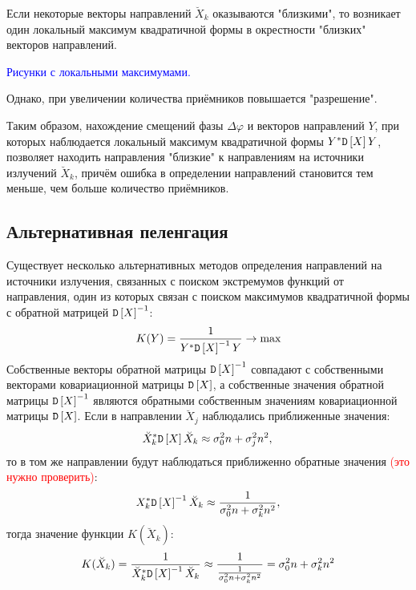 Если некоторые векторы направлений $\breve{X}_k$ оказываются "близкими"{}, то возникает один локальный максимум квадратичной формы в окрестности "близких"{} векторов направлений.

\begin{Matlab}
\end{Matlab}
\textcolor{blue}{Рисунки с локальными максимумами.}

Однако,  при увеличении количества приёмников повышается "разрешение"{}.

Таким образом, нахождение смещений фазы $\Delta \varphi$ и векторов направлений $Y$, при которых наблюдается локальный максимум квадратичной формы
$Y^* \mathtt{D} \left [ X \right ] Y$, позволяет находить направления "близкие"{} к направлениям на источники излучений $\breve{X}_k$, причём ошибка в определении направлений
становится тем меньше, чем больше количество приёмников.

\subsection{Альтернативная пеленгация}

Существует несколько альтернативных методов определения направлений на источники излучения, связанных с поиском экстремумов функций от направления, один из которых
связан с поиском максимумов квадратичной формы с обратной матрицей $\mathtt{D} \left [ X \right ]^{-1}$:
\[
    K(Y) = \frac{1}{Y^* \mathtt{D} \left [ X \right ]^{-1} Y} \rightarrow \max
\]
Собственные векторы обратной матрицы $\mathtt{D} \left [ X \right ]^{-1}$ совпадают с собственными векторами ковариационной матрицы $\mathtt{D} \left [ X \right ]$, а собственные значения
обратной матрицы $\mathtt{D} \left [ X \right ]^{-1}$ являются обратными собственным значениям ковариационной матрицы $\mathtt{D} \left [ X \right ]$. Если в направлении $\breve{X}_j$
наблюдались приближенные значения:
\[
    \breve{X}_k^* \mathtt{D} \left [ X \right ] \breve{X}_k \approx \sigma_0^2 n + \sigma_j^2 n^2 , \\
\]
то в том же направлении будут наблюдаться приближенно обратные значения \textcolor{red}{(это нужно проверить)}:
\[
    X_k^* \mathtt{D} \left [ X \right ]^{-1} \breve{X}_k
    \approx \frac{1}{\sigma_0^2 n + \sigma_k^2 n^2},
\]
тогда значение функции $K(\breve{X}_k)$:
\[
    K(\breve{X}_k)
    = \frac{1}{\breve{X}_k^* \mathtt{D} \left [ X \right ]^{-1} \breve{X}_k}
    \approx \frac{1}{\frac{1}{\sigma_0^2 n + \sigma_k^2 n^2}}
    = \sigma_0^2 n + \sigma_k^2 n^2
\]
